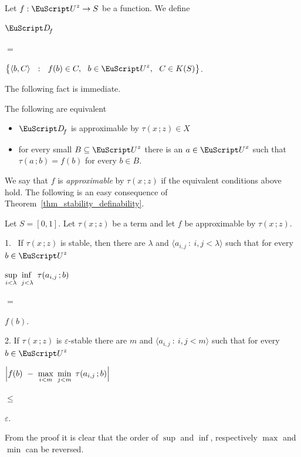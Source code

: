 Let $f:{\EuScript U}^{z}\to S$ be a function.
We define
{\def\medrel#1{\parbox{5ex}{\hfil $#1$}}
\def\ceq#1#2#3{\parbox[t]{15ex}{$\displaystyle #1$}\medrel{#2}{$\displaystyle #3$}}

\ceq{\hfill{\EuScript D\!}_f}{=}{\big\{\langle b,C\rangle\ \ :\ \ f(b)\in C,\ \ b\in{\EuScript U}^{z},\ \ C\in K(S)\big\}}.}

The following fact is immediate.

\begin{fact}
  The following are equivalent
  \begin{itemize}
    \item [1.] ${\EuScript D\!}_f$ is approximable by $\tau(x\,;z)\in X$
    \item [2.] for every small $B\subseteq{\EuScript U}^z$ there is an $a\in{\EuScript U}^x$ such that $\tau(a\,;b)=f(b)$ for every $b\in B$.\smallskip
  \end{itemize}
\end{fact}

We say that $f$ is \emph{approximable\/} by $\tau(x\,;z)$ if the equivalent conditions above hold.
The following is an easy consequence of Theorem~\ref{thm_stability_definability}.

\def\medrel#1{\parbox{5ex}{\hfil $#1$}}
\def\ceq#1#2#3{\parbox[t]{38ex}{$\displaystyle #1$}\medrel{#2}{$\displaystyle #3$}}

\begin{theorem}
  Let $S=[0,1]$.
  Let $\tau(x\,;z)$ be a term and let $f$ be approximable by $\tau(x\,;z)$.\smallskip
  
  1. \ If $\tau(x\,;z)$ is stable, then there are $\lambda$ and $\langle a_{i,j}\ :\ i,j<\lambda\rangle$ such that for every $b\in{\EuScript U}^z$\smallskip

  \ceq{\hfill \sup_{i<\lambda}\ \mathop{\inf\vphantom{p}}_{j<\lambda}\ \tau(a_{i,j}\,;b)}{=}{f(b).}\smallskip

  2.  If $\tau(x\,;z)$ is $\varepsilon$-stable there are $m$ and $\langle a_{i,j}\ :\ i,j<m\rangle$ such that for every $b\in{\EuScript U}^z$\smallskip

  \ceq{\hfill\Big|f(b)\ -\ \max_{i<m}\ \min_{j<m}\ \tau(a_{i,j}\,;b)\Big|}{\le}{\varepsilon.}
\end{theorem}


From the proof it is clear that the order of $\sup$ and $\inf$, respectively $\max$ and $\min$ can be reversed.

